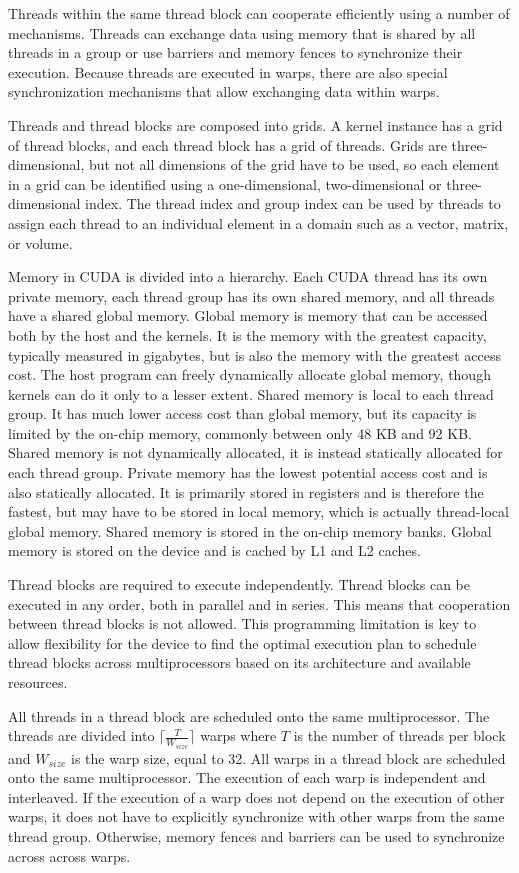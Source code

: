 Threads within the same thread block can cooperate efficiently using a number of mechanisms. Threads can exchange data using memory that is shared by all threads in a group or use barriers and memory fences to synchronize their execution. Because threads are executed in warps, there are also special synchronization mechanisms that allow exchanging data within warps.

Threads and thread blocks are composed into grids. A kernel instance has a grid of thread blocks, and each thread block has a grid of threads. Grids are three-dimensional, but not all dimensions of the grid have to be used, so each element in a grid can be identified using a one-dimensional, two-dimensional or three-dimensional index. The thread index and group index can be used by threads to assign each thread to an individual element in a domain such as a vector, matrix, or volume.

Memory in CUDA is divided into a hierarchy. Each CUDA thread has its own private memory, each thread group has its own shared memory, and all threads have a shared global memory. Global memory is memory that can be accessed both by the host and the kernels. It is the memory with the greatest capacity, typically measured in gigabytes, but is also the memory with the greatest access cost. The host program can freely dynamically allocate global memory, though kernels can do it only to a lesser extent. Shared memory is local to each thread group. It has much lower access cost than global memory, but its capacity is limited by the on-chip memory, commonly between only 48 KB and 92 KB. Shared memory is not dynamically allocated, it is instead statically allocated for each thread group. Private memory has the lowest potential access cost and is also statically allocated. It is primarily stored in registers and is therefore the fastest, but may have to be stored in local memory, which is actually thread-local global memory. Shared memory is stored in the on-chip memory banks. Global memory is stored on the device and is cached by L1 and L2 caches.

Thread blocks are required to execute independently. Thread blocks can be executed in any order, both in parallel and in series. This means that cooperation between thread blocks is not allowed. This programming limitation is key to allow flexibility for the device to find the optimal execution plan to schedule thread blocks across multiprocessors based on its architecture and available resources.

All threads in a thread block are scheduled onto the same multiprocessor. The threads are divided into \(\lceil\frac{T}{W_{size}}\rceil\) warps where \(T\) is the number of threads per block and \(W_{size}\) is the warp size, equal to 32. All warps in a thread block are scheduled onto the same multiprocessor. The execution of each warp is independent and interleaved. If the execution of a warp does not depend on the execution of other warps, it does not have to explicitly synchronize with other warps from the same thread group. Otherwise, memory fences and barriers can be used to synchronize across across warps.

